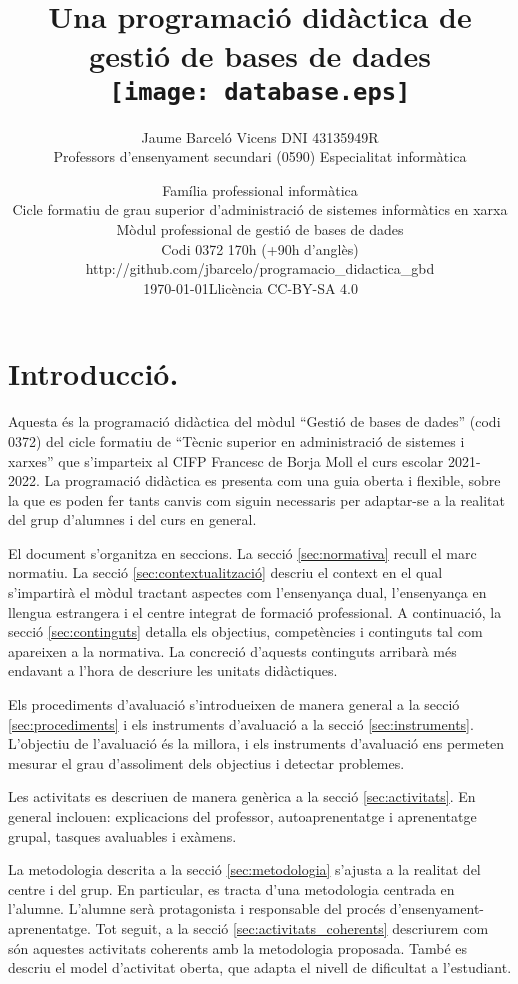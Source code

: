 \documentclass[catalan, a4paper, 12pt, titlepage]{article}
\title{Una programació didàctica de \\
gestió de bases de dades\\
	\texttt{[image: database.eps]}
	}
\author{
	Jaume Barceló Vicens
	DNI 43135949R\\
	Professors d'ensenyament secundari (0590)
	Especialitat informàtica}
\date{
	Família professional informàtica \\
	Cicle formatiu de grau superior d’administració de sistemes informàtics en xarxa\\
	Mòdul professional de gestió de bases de dades\\
	Codi 0372 170h (+90h d'anglès)\\
	http://github.com/jbarcelo/programacio\_didactica\_gbd \\
	\faCalendar*[regular] \today \qquad  Llicència CC-BY-SA 4.0 \faCreativeCommons\ \faCreativeCommonsBy\ \faCreativeCommonsSa}
\begin{document}
\pagestyle{empty}

\maketitle

\tableofcontents 

\pagestyle{fancy}

\section{Introducció.}

Aquesta és la programació didàctica del mòdul ``Gestió de bases de dades'' (codi 0372) del cicle formatiu de ``Tècnic superior en administració de sistemes i xarxes'' que s'imparteix al CIFP Francesc de Borja Moll el curs escolar 2021-2022.
La programació didàctica es presenta com una guia oberta i flexible, sobre la que es poden fer tants canvis com siguin necessaris per adaptar-se a la realitat del grup d'alumnes i del curs en general.

El document s'organitza en seccions. 
La secció \ref{sec:normativa} recull el marc normatiu.
La secció \ref{sec:contextualització} descriu el context en el qual s'impartirà el mòdul tractant aspectes com l'ensenyança dual, l'ensenyança en llengua estrangera i el centre integrat de formació professional.
A continuació, la secció \ref{sec:continguts} detalla els objectius, competències i continguts tal com apareixen a la normativa.
La concreció d'aquests continguts arribarà més endavant a l'hora de descriure les unitats didàctiques.

Els procediments d'avaluació s'introdueixen de manera general a la secció \ref{sec:procediments} i els instruments d'avaluació a la secció \ref{sec:instruments}.
L'objectiu de l'avaluació és la millora, i els instruments d'avaluació ens permeten mesurar el grau d'assoliment dels objectius i detectar problemes.

Les activitats es descriuen de manera genèrica a la secció \ref{sec:activitats}.
En general inclouen: explicacions del professor, autoaprenentatge i aprenentatge grupal, tasques avaluables i exàmens.

La metodologia descrita a la secció \ref{sec:metodologia} s'ajusta a la realitat del centre i del grup.
En particular, es tracta d'una metodologia centrada en l'alumne.
L'alumne serà protagonista i responsable del procés d'ensenyament-aprenentatge.
Tot seguit, a la secció \ref{sec:activitats_coherents} descriurem com són aquestes activitats coherents amb la metodologia proposada.
També es descriu el model d'activitat oberta, que adapta el nivell de dificultat a l'estudiant.
\end{document}
